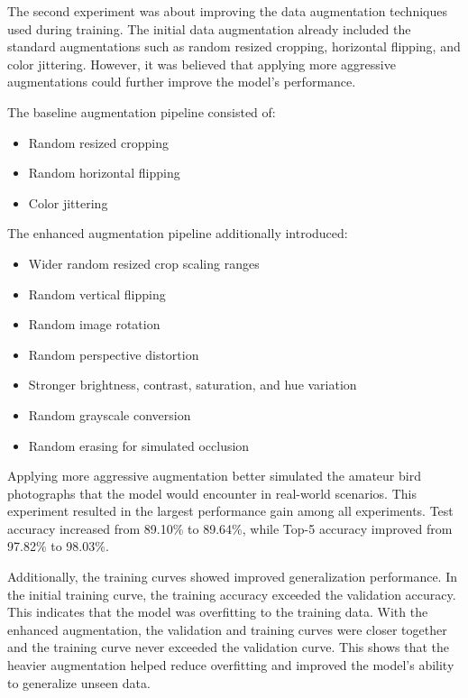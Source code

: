 The second experiment was about improving the data augmentation techniques used during training.
The initial data augmentation already included the standard augmentations such as random resized 
cropping,
horizontal flipping, and color jittering. However, it was believed that applying more aggressive 
augmentations could further improve the model's performance.

The baseline augmentation pipeline consisted of:

\begin{itemize}
    \item Random resized cropping
    \item Random horizontal flipping
    \item Color jittering
\end{itemize}

The enhanced augmentation pipeline additionally introduced:

\begin{itemize}
    \item Wider random resized crop scaling ranges
    \item Random vertical flipping
    \item Random image rotation
    \item Random perspective distortion
    \item Stronger brightness, contrast, saturation, and hue variation
    \item Random grayscale conversion
    \item Random erasing for simulated occlusion
\end{itemize}

Applying more aggressive augmentation better simulated the amateur bird photographs that the model 
would encounter in real-world scenarios. This experiment resulted in the largest performance gain 
among all experiments. Test accuracy increased from 89.10\% to 89.64\%, while Top-5 accuracy improved 
from 97.82\% to 98.03\%.

Additionally, the training curves showed improved generalization performance. In the initial training 
curve, the training accuracy exceeded the validation accuracy. This indicates that the model was 
overfitting to the training data. With the enhanced augmentation, the validation and training curves 
were closer together and the training curve never exceeded the validation curve. This shows that the 
heavier augmentation helped reduce overfitting and improved the model's ability to generalize unseen 
data. 

